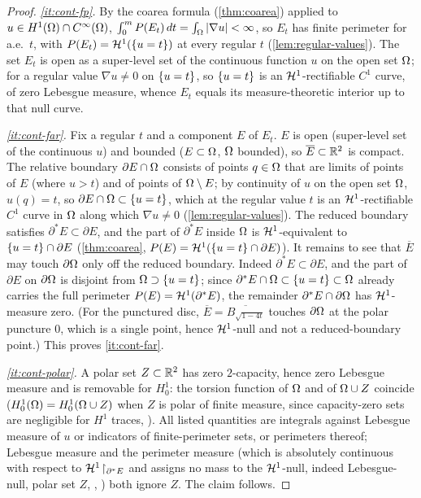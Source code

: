 \begin{proof}
\emph{\ref{it:cont-fp}.} By the coarea formula (\cref{thm:coarea}) applied
to $u\in H^1(\Omega)\cap C^\infty(\Omega)$, $\int_0^mP(E_t)\,dt
=\int_\Omega|\nabla u|<\infty$, so $E_t$ has finite perimeter for a.e.\ $t$,
with $P(E_t)=\mathcal{H}^1(\left\{u=t\right\})$ at every regular $t$
(\cref{lem:regular-values}). The set $E_t$ is open as a super-level set of
the continuous function $u$ on the open set $\Omega$; for a regular value
$\nabla u\neq0$ on $\left\{u=t\right\}$, so $\left\{u=t\right\}$ is an $\mathcal{H}^1$-rectifiable
$C^1$ curve, of zero Lebesgue measure, whence $E_t$ equals its
measure-theoretic interior up to that null curve.

\emph{\ref{it:cont-far}.} Fix a regular $t$ and a component $E$ of $E_t$.
$E$ is open (super-level set of the continuous $u$) and bounded ($E\subset
\Omega$, $\Omega$ bounded), so $\overline E\subset\mathbb{R}^2$ is compact. The relative
boundary $\partial E\cap\Omega$ consists of points $q\in\Omega$ that are limits of
points of $E$ (where $u>t$) and of points of $\Omega\setminus E$; by continuity
of $u$ on the open set $\Omega$, $u(q)=t$, so $\partial E\cap\Omega\subset
\left\{u=t\right\}$, which at the regular value $t$ is an $\mathcal{H}^1$-rectifiable $C^1$
curve in $\Omega$ along which $\nabla u\neq0$ (\cref{lem:regular-values}). The
reduced boundary satisfies $\partial^*E\subset\partial E$, and the part of
$\partial^*E$ inside $\Omega$ is $\mathcal{H}^1$-equivalent to $\left\{u=t\right\}\cap\partial E$
(\cref{thm:coarea}, $P(E)=\mathcal{H}^1(\left\{u=t\right\}\cap\partial E)$). It remains to
see that $\overline E$ may touch $\partial\Omega$ only off the reduced boundary.
Indeed $\partial^*E\subset\partial E$, and the part of $\partial E$ on
$\partial\Omega$ is disjoint from $\Omega\supset\left\{u=t\right\}$; since
$\partial^*E\cap\Omega\subset\left\{u=t\right\}\subset\Omega$ already carries the full
perimeter $P(E)=\mathcal{H}^1(\partial^*E)$, the remainder $\partial^*E\cap
\partial\Omega$ has $\mathcal{H}^1$-measure zero. (For the punctured disc, $\overline E
=\overline{B_{\sqrt{1-4t}}}$ touches $\partial\Omega$ at the polar puncture
$0$, which is a single point, hence $\mathcal{H}^1$-null and not a reduced-boundary
point.) This proves \ref{it:cont-far}.

\emph{\ref{it:cont-polar}.} A polar set $Z\subset\mathbb{R}^2$ has zero
$2$-capacity, hence zero Lebesgue measure and is removable for $H^1_0$: the
torsion function of $\Omega$ and of $\Omega\cup Z$ coincide ($H^1_0(\Omega)=
H^1_0(\Omega\cup Z)$ when $Z$ is polar of finite measure, since capacity-zero
sets are negligible for $H^1$ traces, \cite[\S4.7]{EvansGariepy2015}). All
listed quantities are integrals against Lebesgue measure of $u$ or
indicators of finite-perimeter sets, or perimeters thereof; Lebesgue measure
and the perimeter measure (which is absolutely continuous with respect to
$\mathcal{H}^1\!\restriction_{\partial^*E}$ and assigns no mass to the $\mathcal{H}^1$-null, indeed
Lebesgue-null, polar set $Z$, \cite[\S5.7]{EvansGariepy2015},
\cite[Thm.~16.2]{Maggi2012}) both ignore $Z$. The claim follows.
\end{proof}


